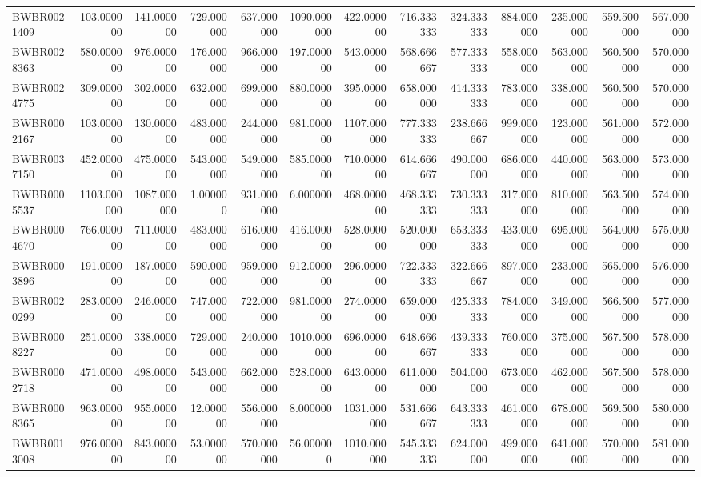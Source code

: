 \begin{longtable}{lrrrrrrrrrrrr}
BWBR0021409 & 103.000000 & 141.000000 & 729.000000 & 637.000000 & 1090.000000 & 422.000000 & 716.333333 & 324.333333 & 884.000000 & 235.000000 & 559.500000 & 567.000000 \\
BWBR0028363 & 580.000000 & 976.000000 & 176.000000 & 966.000000 & 197.000000 & 543.000000 & 568.666667 & 577.333333 & 558.000000 & 563.000000 & 560.500000 & 570.000000 \\
BWBR0024775 & 309.000000 & 302.000000 & 632.000000 & 699.000000 & 880.000000 & 395.000000 & 658.000000 & 414.333333 & 783.000000 & 338.000000 & 560.500000 & 570.000000 \\
BWBR0002167 & 103.000000 & 130.000000 & 483.000000 & 244.000000 & 981.000000 & 1107.000000 & 777.333333 & 238.666667 & 999.000000 & 123.000000 & 561.000000 & 572.000000 \\
BWBR0037150 & 452.000000 & 475.000000 & 543.000000 & 549.000000 & 585.000000 & 710.000000 & 614.666667 & 490.000000 & 686.000000 & 440.000000 & 563.000000 & 573.000000 \\
BWBR0005537 & 1103.000000 & 1087.000000 & 1.000000 & 931.000000 & 6.000000 & 468.000000 & 468.333333 & 730.333333 & 317.000000 & 810.000000 & 563.500000 & 574.000000 \\
BWBR0004670 & 766.000000 & 711.000000 & 483.000000 & 616.000000 & 416.000000 & 528.000000 & 520.000000 & 653.333333 & 433.000000 & 695.000000 & 564.000000 & 575.000000 \\
BWBR0003896 & 191.000000 & 187.000000 & 590.000000 & 959.000000 & 912.000000 & 296.000000 & 722.333333 & 322.666667 & 897.000000 & 233.000000 & 565.000000 & 576.000000 \\
BWBR0020299 & 283.000000 & 246.000000 & 747.000000 & 722.000000 & 981.000000 & 274.000000 & 659.000000 & 425.333333 & 784.000000 & 349.000000 & 566.500000 & 577.000000 \\
BWBR0008227 & 251.000000 & 338.000000 & 729.000000 & 240.000000 & 1010.000000 & 696.000000 & 648.666667 & 439.333333 & 760.000000 & 375.000000 & 567.500000 & 578.000000 \\
BWBR0002718 & 471.000000 & 498.000000 & 543.000000 & 662.000000 & 528.000000 & 643.000000 & 611.000000 & 504.000000 & 673.000000 & 462.000000 & 567.500000 & 578.000000 \\
BWBR0008365 & 963.000000 & 955.000000 & 12.000000 & 556.000000 & 8.000000 & 1031.000000 & 531.666667 & 643.333333 & 461.000000 & 678.000000 & 569.500000 & 580.000000 \\
BWBR0013008 & 976.000000 & 843.000000 & 53.000000 & 570.000000 & 56.000000 & 1010.000000 & 545.333333 & 624.000000 & 499.000000 & 641.000000 & 570.000000 & 581.000000 \\

\end{longtable}
